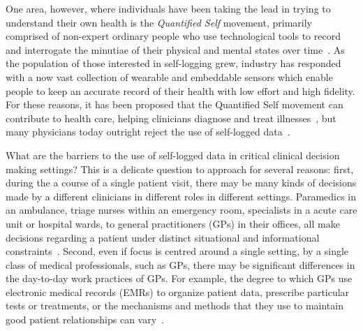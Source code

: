 \documentclass{sigchi}
\begin{document}
One area, however, where individuals have been taking the lead in trying to understand their own health is the \emph{Quantified Self} movement, primarily comprised of non-expert ordinary people who use technological tools to record and interrogate the minutiae of their physical and mental states over time~\cite{Swan2012}.   As the population of those interested in self-logging grew, industry has responded with a now vast collection of wearable and embeddable sensors which enable people to keep an accurate record of their health with low effort and high fidelity. For these reasons, it has been proposed that the Quantified Self movement can contribute to health care, helping clinicians diagnose and treat illnesses~\cite{Swan2009}, but many physicians today outright reject the use of self-logged data~\cite{sullivan_guess_2014}. %

What are the barriers to the use of self-logged data in critical clinical decision making settings?  This is a delicate question to approach for several reasons: first, during the a course of a single patient visit, there may be many kinds of decisions made by a different clinicians in different roles in different settings.   Paramedics in an ambulance, triage nurses within an emergency room, specialists in a acute care unit or hospital wards, to general practitioners (GPs) in their offices, all make decisions regarding a patient under distinct situational and informational constraints~\cite{Croskerry2013}. Second, even if focus is centred around a single setting, by a single class of medical professionals, such as GPs, there may be significant differences in the day-to-day work practices of GPs. For example, the degree to which GPs use electronic medical records (EMRs) to organize patient data, prescribe particular tests or treatments, or the mechanisms and methods that they use to maintain good patient relationships can vary~\cite{smellie_is_2002}. 
\end{document}
